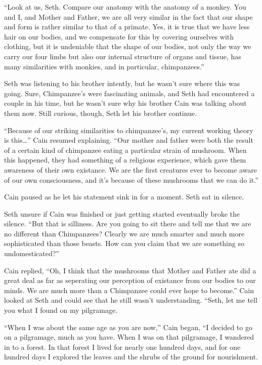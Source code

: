 \documentclass[12pt,twoside,titlepage]{report}
\begin{document}
``Look at us, Seth. Compare our anatomy with the anatomy of a monkey.
You and I, and Mother and Father, we are all very similar in the fact
that our shape and form is rather similar to that of a primate. Yes, it
is true that we have less hair on our bodies, and we compensate for this
by covering ourselves with clothing, but it is undeniable that the shape
of our bodies, not only the way we carry our four limbs but also our
internal structure of organs and tissue, has many similarities with
monkies, and in particular, chimpanzees.''

Seth was listening to his brother intently, but he wasn't sure where
this was going. Sure, Chimpanzee's were fascinating animals, and Seth
had encountered a couple in his time, but he wasn't sure why his brother
Cain was talking about them now. Still curious, though, Seth let his
brother continue.

``Because of our striking similarities to chimpanzee's, my current
working theory is this\ldots{}'' Cain resumed explaining. ``Our mother
and father were both the result of a certain kind of chimpanzee eating a
particular strain of mushroom. When this happened, they had something of
a religious experience, which gave them awareness of their own
existance. We are the first creatures ever to become aware of our own
consciousness, and it's because of these mushrooms that we can do it.''

Cain paused as he let his statement sink in for a moment. Seth sat in
silence.

Seth unsure if Cain was finished or just getting started eventually
broke the silence. ``But that is silliness. Are you going to sit there
and tell me that we are no different than Chimpanzees? Clearly we are
much smarter and much more sophisticated than those beasts. How can you
claim that we are something so undomesticated?''

Cain replied, ``Oh, I think that the mushrooms that Mother and Father
ate did a great deal as far as seperating our perception of existance
from our bodies to our minds. We are much more than a Chimpanzee could
ever hope to become.'' Cain looked at Seth and could see that he still
wasn't understanding. ``Seth, let me tell you what I found on my
pilgramage.

``When I was about the same age as you are now,'' Cain began, ``I
decided to go on a pilgramage, much as you have. When I was on that
pilgramage, I wandered in to a forest. In that forest I lived for nearly
one hundred days, and for one hundred days I explored the leaves and the
shrubs of the ground for nourishment.
\end{document}
